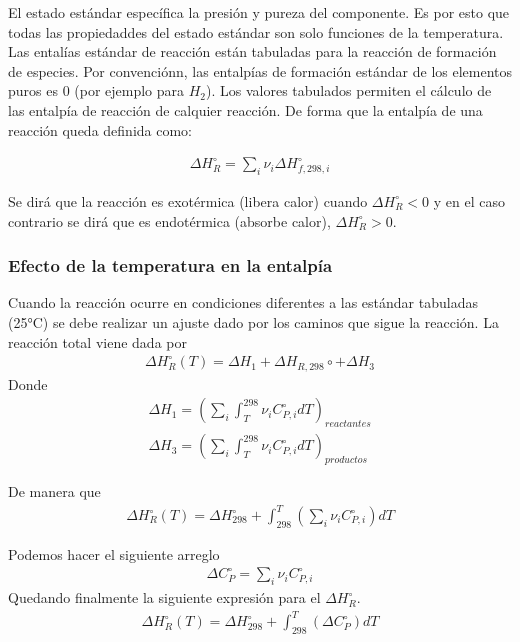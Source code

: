El estado estándar específica la presión y pureza del componente. Es por esto que todas las propiedaddes del estado estándar son solo funciones de la temperatura.
Las entalías estándar de reacción están tabuladas para la reacción de formación de especies. Por convenciónn, las entalpías de formación estándar de los elementos puros es 0 (por ejemplo para $H_2$). Los valores tabulados permiten el cálculo de las entalpía de reacción de calquier reacción.
De forma que la entalpía de una reacción queda definida como:

\begin{align}
    \Delta H_{R}^\circ = \sum_i \nu_i \Delta H_{f,298,i}^\circ
\end{align}

Se dirá que la reacción es exotérmica (libera calor) cuando $\Delta H_R^\circ <0$ y en el caso contrario se dirá que es endotérmica (absorbe calor), $\Delta H_R^\circ>0$.

\subsubsection{Efecto de la temperatura en la entalpía}

Cuando la reacción ocurre en condiciones diferentes a las estándar tabuladas (25°C) se debe realizar un ajuste dado por los caminos que sigue la reacción. La reacción total viene dada por
\begin{align}
    \Delta H_R^\circ(T)=\Delta H_1+ \Delta H_{R,298}\circ+\Delta H_3
\end{align}
Donde 
\begin{align}
    \Delta H_1=\left(\sum_i \int_T^{298}\nu_iC_{P,i}^\circ dT\right)_{reactantes}\\
    \Delta H_3=\left(\sum_i \int_T^{298}\nu_iC_{P,i}^\circ dT\right)_{productos}
\end{align}

De manera que 
\begin{align}
    \Delta H_R^\circ(T)=\Delta H_{298}^\circ+\int_{298}^T\left(\sum_i \nu_iC_{P,i}^\circ \right) dT
\end{align}

Podemos hacer el siguiente arreglo
\begin{align}
    \Delta C_P^\circ=\sum_i \nu_iC_{P,i}^\circ
\end{align}
Quedando finalmente la siguiente expresión para el $\Delta H_R^\circ$.
\begin{align}
    \Delta H_R^\circ(T)=\Delta H_{298}^\circ+\int_{298}^T\left(\Delta C_P^\circ \right) dT
\end{align}

